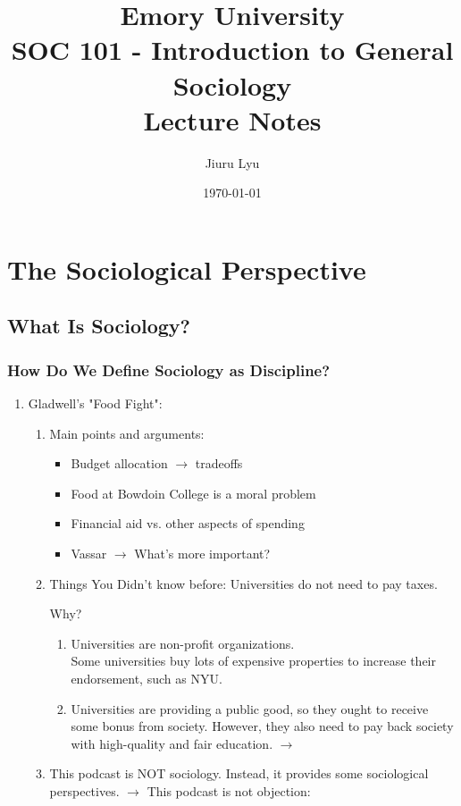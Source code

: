 \documentclass[12pt,a4paper]{article}
\title{Emory University\\\textbf{SOC 101 - Introduction to General Sociology \\Lecture Notes}}
\author{Jiuru Lyu}
\date{\today}
\begin{document}
\maketitle
\tableofcontents
\newpage

\section{The Sociological Perspective}
\subsection{What Is Sociology?}
\subsubsection{How Do We Define Sociology as Discipline?}
\begin{enumerate}
	\item Gladwell's "Food Fight":
	\begin{enumerate}
		\item Main points and arguments:
		\begin{itemize}
			\item Budget allocation $\rightarrow$ tradeoffs
			\item Food at Bowdoin College is a moral problem
			\item Financial aid vs. other aspects of spending
			\item Vassar $\rightarrow$ What's more important?
		\end{itemize} 
		\item Things You Didn't know before: Universities do not need to pay taxes.
		\begin{prf}{Why?}
			\begin{enumerate}
				\item Universities are non-profit organizations. \\Some universities buy lots of expensive properties to increase their endorsement, such as NYU. 
				\item Universities are providing a public good, so they ought to receive some bonus from society. However, they also need to pay back society with high-quality and fair education. $\rightarrow$ \textbf{\color{red}{Privilege leads to responsibilities.}}
			\end{enumerate}
		\end{prf} 
		\item This podcast is NOT sociology. Instead, it provides some sociological perspectives. $\rightarrow$ This podcast is not objection: 

\end{enumerate}
\end{enumerate}
\end{document}
